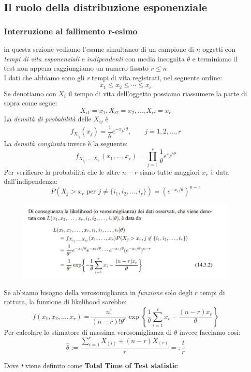 \documentclass[]{article}
\begin{document}
    \subsection{Il ruolo della distribuzione esponenziale}
    \subsubsection{Interruzione al fallimento r-esimo}
    in questa sezione vediamo l'esame simultaneo di un campione di $n$ oggetti con \textit{tempi di vita esponenziali} e \textit{indipendenti} con media incognita $\theta$ e terminiamo il test non appena raggiungiamo un numero fissato $r \leq n$ \\
    I dati che abbiamo sono gli \textit{r} tempi di vita registrati, nel seguente ordine:
    \[ x_1 \leq x_2 \leq \cdots \leq x_r \]
    Se denotiamo con $X_i$ il tempo di vita dell'oggetto possiamo riassumere la parte di sopra come segue:
    \[ X_{i1} = x_1, X_{i2} = x_2, \ldots, X_{ir} = x_r \]
    La \textit{densità di probabilità} delle $X_{ij}$ è
    \[ f_{X_{i_j}} (x_j) = \frac{1}{\theta} e^{-x_j / \theta}, \qquad j = 1,2,\ldots, r \]
    La \textit{densità congiunta} invece è la seguente:
    \[ f_{X_{i_j}, \ldots, X_{i_r}} (x_1, \ldots, x_r) = \prod_{j=1}^{r} \frac{1}{\theta} e^{x_j / \theta} \]
    Per verificare la probabilità che le altre $n-r$ siano tutte maggiori $x_r$ è data dall'indipendenza:
    \[ P(X_j > x_r \text{ per } j \not = \{ i_1, i_2, \ldots, i_r \}) = (e^{-x_r / \theta})^{n-r} \]
    \begin{figure}[H]
        \includegraphics[width=\textwidth]{images/boh_12.png}
    \end{figure}
    Se abbiamo bisogno della verosomiglianza in \textit{funzione} solo degli $r$ tempi di rottura, la funzione di likelihood sarebbe:
    \[ f(x_1, x_2, \ldots, x_r) = \frac{n!}{(n-r)! \theta^r} \exp \left\{ \frac{1}{\theta} \sum_{i=1}^{r} x_i - \frac{(n-r) x_r}{\theta} \right\} \]
    Per calcolare lo stimatore di massima verosomiglianza di $\theta$ invece facciamo cosi:
    \[ \hat{\theta} := \frac{\sum_{i=1}^{r} X_{(i)} + (n-r) X_{(r)}}{r} =: \frac{t}{r} \]
    \centerline{Dove \textit{t} viene definito come \textbf{Total Time of Test statistic}}
\end{document}
